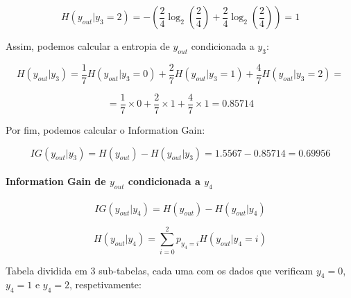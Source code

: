 \documentclass{article}
\begin{document}
\[ H(y_{out}|y_3 = 2) = - \left( \frac{2}{4} \log_2 \left( \frac{2}{4} \right) + \frac{2}{4} \log_2 \left( \frac{2}{4} \right) \right) = 1 \]

Assim, podemos calcular a entropia de $y_{out}$ condicionada a $y_3$:

\[ H(y_{out}|y_3) = \frac{1}{7} H(y_{out}|y_3 = 0) + \frac{2}{7} H(y_{out}|y_3 = 1) + \frac{4}{7} H(y_{out}|y_3 = 2) = \]

\[ = \frac{1}{7} \times 0 + \frac{2}{7} \times 1 + \frac{4}{7} \times 1 = 0.85714 \]

Por fim, podemos calcular o Information Gain:

\[ IG(y_{out}|y_3) = H(y_{out}) - H(y_{out}|y_3) = 1.5567 - 0.85714 = 0.69956 \]

\paragraph{Information Gain de $y_{out}$ condicionada a $y_4$}

\[ IG(y_{out}|y_4) = H(y_{out}) - H(y_{out}|y_4) \]

\[ H(y_{out}|y_4) = \sum_{i=0}^{2} p_{y_4 = i} H(y_{out}|y_4 = i) \]

Tabela dividida em 3 sub-tabelas, cada uma com os dados que verificam $y_4 = 0$, $y_4 = 1$ e $y_4 = 2$, respetivamente:
\end{document}
